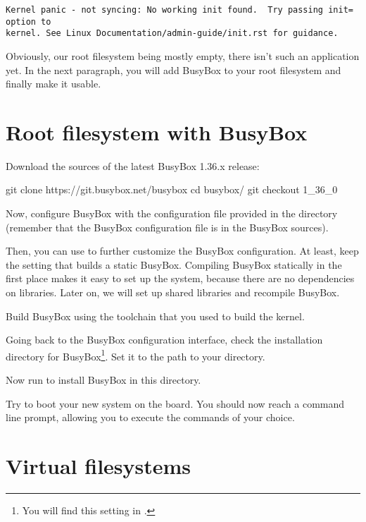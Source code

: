 \begin{verbatim}
Kernel panic - not syncing: No working init found.  Try passing init= option to
kernel. See Linux Documentation/admin-guide/init.rst for guidance.
\end{verbatim}

Obviously, our root filesystem being mostly empty, there isn't such an
application yet. In the next paragraph, you will add BusyBox to your root
filesystem and finally make it usable.

\section{Root filesystem with BusyBox}

Download the sources of the latest BusyBox 1.36.x release:

\begin{bashinput}
git clone https://git.busybox.net/busybox
cd busybox/
git checkout 1_36_0
\end{bashinput}

Now, configure BusyBox with the configuration file provided in the
 directory (remember that the BusyBox configuration file
is  in the BusyBox sources).

Then, you can use  to further customize
the BusyBox configuration. At least, keep the setting that
builds a static BusyBox. Compiling BusyBox statically in the first
place makes it easy to set up the system, because there are no dependencies
on libraries. Later on, we will set up shared libraries and recompile BusyBox.

Build BusyBox using the toolchain that you used to build the kernel.

Going back to the BusyBox configuration interface,
check the installation directory for BusyBox\footnote{You will find
this setting in
.}.
Set it to the path to your  directory.

Now run  to install BusyBox in this directory.

Try to boot your new system on the board. You should now reach a
command line prompt, allowing you to execute the commands of your
choice.

\section{Virtual filesystems}


